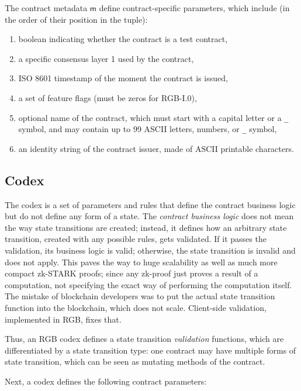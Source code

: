 \documentclass[a4paper]{article}
\begin{document}
\begin{multicols}{2}

The contract metadata $\mathsf{m}$ define contract-specific parameters, which include
(in the order of their position in the tuple):

\begin{enumerate}
\item boolean indicating whether the contract is a test contract,
\item a specific consensus layer 1 used by the contract,
\item ISO 8601 timestamp of the moment the contract is issued,
\item a set of feature flags (must be zeros for RGB-I.0),
\item optional name of the contract, which must start with a capital letter or a \texttt{\_} symbol,
  and may contain up to 99 ASCII letters, numbers, or \texttt{\_} symbol,
\item an identity string of the contract issuer, made of ASCII printable characters.
\end{enumerate}

\subsection{Codex}\label{Codex}


The codex is a set of parameters and rules that define the contract business logic
but do not define any form of a state. The \emph{contract business logic} does not mean
the way state transitions are created; instead, it defines how an arbitrary
state transition, created with any possible rules, gets validated. If it passes the validation,
its business logic is valid; otherwise, the state transition is invalid and does not apply.
This paves the way to huge scalability as well as much more compact zk-STARK proofs;
since any zk-proof just proves a result of a computation,
not specifying the exact way of performing the computation itself.
The mistake of blockchain developers was to put the actual state transition function into
the blockchain, which does not scale. Client-side validation, implemented in RGB, fixes that.

Thus, an RGB codex defines a state transition \emph{validation} functions,
which are differentiated by a state transition type:
one contract may have multiple forms of state transition,
which can be seen as mutating methods of the contract.

Next, a codex defines the following contract parameters:


\end{multicols}
\end{document}
